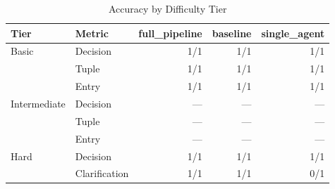 \begin{table}[htbp]
\centering
\caption{Accuracy by Difficulty Tier}
\label{tab:tier-breakdown}
\begin{tabular}{ll rrr}
\toprule
Tier & Metric & full\_pipeline & baseline & single\_agent \\
\midrule
  Basic & Decision & 1/1 & 1/1 & 1/1 \\
   & Tuple & 1/1 & 1/1 & 1/1 \\
   & Entry & 1/1 & 1/1 & 1/1 \\
  \midrule
  Intermediate & Decision & --- & --- & --- \\
   & Tuple & --- & --- & --- \\
   & Entry & --- & --- & --- \\
  \midrule
  Hard & Decision & 1/1 & 1/1 & 1/1 \\
   & Clarification & 1/1 & 1/1 & 0/1 \\
\bottomrule
\end{tabular}
\end{table}
